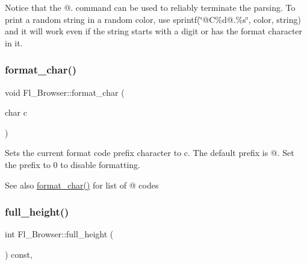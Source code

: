 Notice that the \textquotesingle{}@.\textquotesingle{} command can be used to reliably terminate the parsing. To print a random string in a random color, use {\ttfamily sprintf(\char`\"{}@\+C\%d@.\%s\char`\"{}, color, string)} and it will work even if the string starts with a digit or has the format character in it. \mbox{\label{class_fl___browser_a53128003f4f9d8e0ad76faa518efa246}} 
\subsubsection{\texorpdfstring{format\+\_\+char()}{format\_char()}\hspace{0.1cm}{\footnotesize\ttfamily [2/2]}}
{\footnotesize\ttfamily void Fl\+\_\+\+Browser\+::format\+\_\+char (\begin{DoxyParamCaption}\item[{char}]{c }\end{DoxyParamCaption})\hspace{0.3cm}{\ttfamily [inline]}}

Sets the current format code prefix character to {\ttfamily c}. The default prefix is \textquotesingle{}@\textquotesingle{}. Set the prefix to 0 to disable formatting. \begin{DoxySeeAlso}{See also}
\hyperlink{class_fl___browser_a129dca59d64baf166503ba59341add69}{format\+\_\+char()} for list of \textquotesingle{}@\textquotesingle{} codes 
\end{DoxySeeAlso}
\mbox{\label{class_fl___browser_aeadc4b1c149e211228f0cfaaf9df929f}} 
\subsubsection{\texorpdfstring{full\+\_\+height()}{full\_height()}}
{\footnotesize\ttfamily int Fl\+\_\+\+Browser\+::full\+\_\+height (\begin{DoxyParamCaption}{ }\end{DoxyParamCaption}) const\hspace{0.3cm}{\ttfamily [protected]}, {\ttfamily [virtual]}}



